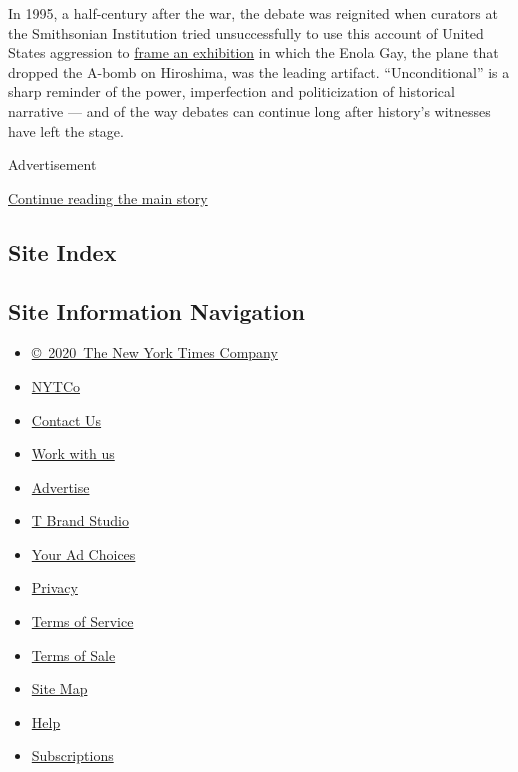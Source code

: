 In 1995, a half-century after the war, the debate was reignited when
curators at the Smithsonian Institution tried unsuccessfully to use this
account of United States aggression to
\href{https://www.atomicheritage.org/history/controversy-over-enola-gay-exhibition}{frame
an exhibition} in which the Enola Gay, the plane that dropped the A-bomb
on Hiroshima, was the leading artifact. ``Unconditional'' is a sharp
reminder of the power, imperfection and politicization of historical
narrative --- and of the way debates can continue long after history's
witnesses have left the stage.

Advertisement

\protect\hyperlink{after-bottom}{Continue reading the main story}

\hypertarget{site-index}{%
\subsection{Site Index}\label{site-index}}

\hypertarget{site-information-navigation}{%
\subsection{Site Information
Navigation}\label{site-information-navigation}}

\begin{itemize}
\tightlist
\item
  \href{https://help.nytimes.com/hc/en-us/articles/115014792127-Copyright-notice}{©~2020~The
  New York Times Company}
\end{itemize}

\begin{itemize}
\tightlist
\item
  \href{https://www.nytco.com/}{NYTCo}
\item
  \href{https://help.nytimes.com/hc/en-us/articles/115015385887-Contact-Us}{Contact
  Us}
\item
  \href{https://www.nytco.com/careers/}{Work with us}
\item
  \href{https://nytmediakit.com/}{Advertise}
\item
  \href{http://www.tbrandstudio.com/}{T Brand Studio}
\item
  \href{https://www.nytimes.com/privacy/cookie-policy\#how-do-i-manage-trackers}{Your
  Ad Choices}
\item
  \href{https://www.nytimes.com/privacy}{Privacy}
\item
  \href{https://help.nytimes.com/hc/en-us/articles/115014893428-Terms-of-service}{Terms
  of Service}
\item
  \href{https://help.nytimes.com/hc/en-us/articles/115014893968-Terms-of-sale}{Terms
  of Sale}
\item
  \href{https://spiderbites.nytimes.com}{Site Map}
\item
  \href{https://help.nytimes.com/hc/en-us}{Help}
\item
  \href{https://www.nytimes.com/subscription?campaignId=37WXW}{Subscriptions}
\end{itemize}
